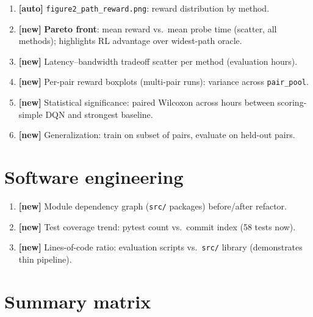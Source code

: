 \documentclass[11pt,a4paper,twoside,openright]{report}
\begin{document}
\begin{enumerate}[resume]
  \item \textbf{[auto]} \texttt{figure2\_path\_reward.png}: reward distribution by method.
  \item \textbf{[new]} \textbf{Pareto front}: mean reward vs.\ mean probe time
    (scatter, all methods); highlights RL advantage over widest-path oracle.
  \item \textbf{[new]} Latency--bandwidth tradeoff scatter per method (evaluation hours).
  \item \textbf{[new]} Per-pair reward boxplots (multi-pair runs): variance across
    \texttt{pair\_pool}.
  \item \textbf{[new]} Statistical significance: paired Wilcoxon across hours between
    scoring-simple DQN and strongest baseline.
  \item \textbf{[new]} Generalization: train on subset of pairs, evaluate on held-out pairs.
\end{enumerate}

\section{Software engineering}

\begin{enumerate}[resume]
  \item \textbf{[new]} Module dependency graph (\texttt{src/} packages) before/after refactor.
  \item \textbf{[new]} Test coverage trend: pytest count vs.\ commit index (58 tests now).
  \item \textbf{[new]} Lines-of-code ratio: evaluation scripts vs.\ \texttt{src/} library
    (demonstrates thin pipeline).
\end{enumerate}

\section{Summary matrix}
\end{document}

